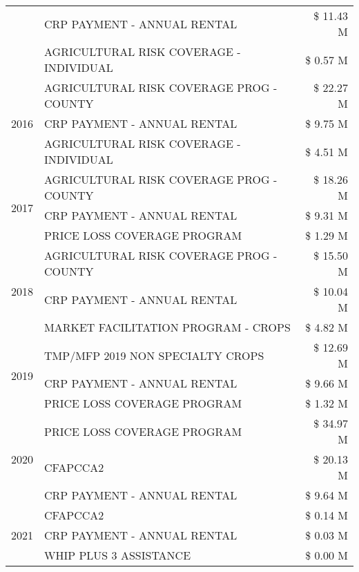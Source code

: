 \begin{tabular}{llr}
 & CRP PAYMENT - ANNUAL RENTAL & \$ 11.43 M \\
 & AGRICULTURAL RISK COVERAGE - INDIVIDUAL & \$ 0.57 M \\
\cline{1-3}
\multirow[t]{3}{*}{2016} & AGRICULTURAL RISK COVERAGE PROG - COUNTY & \$ 22.27 M \\
 & CRP PAYMENT - ANNUAL RENTAL & \$ 9.75 M \\
 & AGRICULTURAL RISK COVERAGE - INDIVIDUAL & \$ 4.51 M \\
\cline{1-3}
\multirow[t]{3}{*}{2017} & AGRICULTURAL RISK COVERAGE PROG - COUNTY & \$ 18.26 M \\
 & CRP PAYMENT - ANNUAL RENTAL & \$ 9.31 M \\
 & PRICE LOSS COVERAGE PROGRAM & \$ 1.29 M \\
\cline{1-3}
\multirow[t]{3}{*}{2018} & AGRICULTURAL RISK COVERAGE PROG - COUNTY & \$ 15.50 M \\
 & CRP PAYMENT - ANNUAL RENTAL & \$ 10.04 M \\
 & MARKET FACILITATION PROGRAM - CROPS & \$ 4.82 M \\
\cline{1-3}
\multirow[t]{3}{*}{2019} & TMP/MFP 2019 NON SPECIALTY CROPS & \$ 12.69 M \\
 & CRP PAYMENT - ANNUAL RENTAL & \$ 9.66 M \\
 & PRICE LOSS COVERAGE PROGRAM & \$ 1.32 M \\
\cline{1-3}
\multirow[t]{3}{*}{2020} & PRICE LOSS COVERAGE PROGRAM & \$ 34.97 M \\
 & CFAPCCA2 & \$ 20.13 M \\
 & CRP PAYMENT - ANNUAL RENTAL & \$ 9.64 M \\
\cline{1-3}
\multirow[t]{3}{*}{2021} & CFAPCCA2 & \$ 0.14 M \\
 & CRP PAYMENT - ANNUAL RENTAL & \$ 0.03 M \\
 & WHIP PLUS 3 ASSISTANCE & \$ 0.00 M \\
\cline{1-3}
\bottomrule
\end{tabular}
